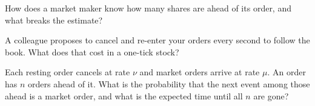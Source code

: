 \begin{interviewq}\label{iq:hf:queue-reactive-models-and-large-tick-assets:4}
How does a market maker know how many shares are ahead of its order, and what breaks the estimate?
\end{interviewq}

\begin{interviewq}\label{iq:hf:queue-reactive-models-and-large-tick-assets:5}
A colleague proposes to cancel and re-enter your orders every second to follow the book. What does that cost in a one-tick stock?
\end{interviewq}

\begin{interviewq}\label{iq:hf:queue-reactive-models-and-large-tick-assets:6}
Each resting order cancels at rate $\nu$ and market orders arrive at rate $\mu$. An order has $n$ orders ahead of it. What is the probability that
the next event among those ahead is a market order, and what is the expected time until all $n$ are gone?
\end{interviewq}
